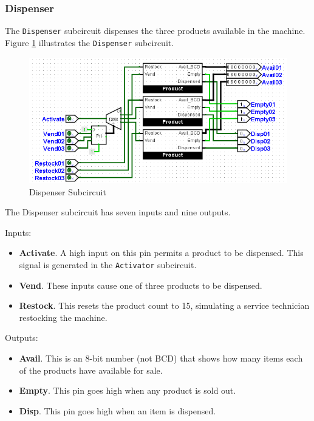 \subsubsection{Dispenser}

The \lstinline[columns=fixed]|Dispenser| subcircuit dispenses the three products available in the machine. Figure \ref{fig:vend-04} illustrates the \lstinline[columns=fixed]|Dispenser| subcircuit.

\begin{figure}[H]
	\centering
	\includegraphics[width=\maxwidth{.95\linewidth}]{gfx/vend-04}
	\caption{Dispenser Subcircuit}
	\label{fig:vend-04}
\end{figure}

The Dispenser subcircuit has seven inputs and nine outputs.

Inputs:

\begin{itemize}
	\item \textbf{Activate}. A high input on this pin permits a product to be dispensed. This signal is generated in the \lstinline[columns=fixed]|Activator| subcircuit.
	\item \textbf{Vend}. These inputs cause one of three products to be dispensed.
	\item \textbf{Restock}. This resets the product count to 15, simulating a service technician restocking the machine.
\end{itemize}

Outputs:

\begin{itemize}
	\item \textbf{Avail}. This is an 8-bit number (not \ac{BCD}) that shows how many items each of the products have available for sale.
	\item \textbf{Empty}. This pin goes high when any product is sold out.
	\item \textbf{Disp}. This pin goes high when an item is dispensed.
\end{itemize}

